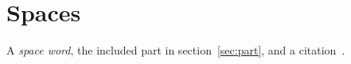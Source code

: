 \documentclass{article}
\newcommand\term[1]{\emph{#1}}
\begin{document}
\tableofcontents
\section{Spaces}\label{sec:spaces}
A \term{space word}, the included part in section~\ref{sec:part}, and a
citation~\cite{spacebook}.
\begin{center}
\end{center}



\end{document}
